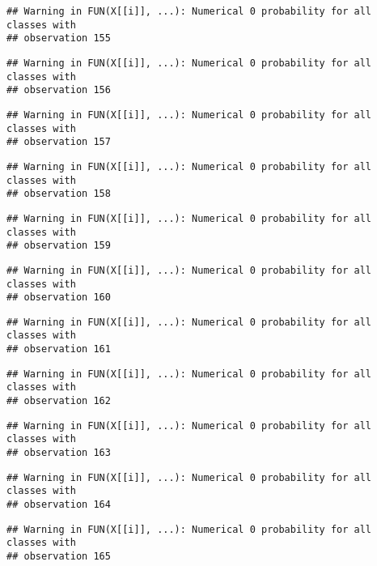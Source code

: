 \documentclass[
]{article}
\begin{document}
\begin{verbatim}
## Warning in FUN(X[[i]], ...): Numerical 0 probability for all classes with
## observation 155
\end{verbatim}

\begin{verbatim}
## Warning in FUN(X[[i]], ...): Numerical 0 probability for all classes with
## observation 156
\end{verbatim}

\begin{verbatim}
## Warning in FUN(X[[i]], ...): Numerical 0 probability for all classes with
## observation 157
\end{verbatim}

\begin{verbatim}
## Warning in FUN(X[[i]], ...): Numerical 0 probability for all classes with
## observation 158
\end{verbatim}

\begin{verbatim}
## Warning in FUN(X[[i]], ...): Numerical 0 probability for all classes with
## observation 159
\end{verbatim}

\begin{verbatim}
## Warning in FUN(X[[i]], ...): Numerical 0 probability for all classes with
## observation 160
\end{verbatim}

\begin{verbatim}
## Warning in FUN(X[[i]], ...): Numerical 0 probability for all classes with
## observation 161
\end{verbatim}

\begin{verbatim}
## Warning in FUN(X[[i]], ...): Numerical 0 probability for all classes with
## observation 162
\end{verbatim}

\begin{verbatim}
## Warning in FUN(X[[i]], ...): Numerical 0 probability for all classes with
## observation 163
\end{verbatim}

\begin{verbatim}
## Warning in FUN(X[[i]], ...): Numerical 0 probability for all classes with
## observation 164
\end{verbatim}

\begin{verbatim}
## Warning in FUN(X[[i]], ...): Numerical 0 probability for all classes with
## observation 165
\end{verbatim}
\end{document}
